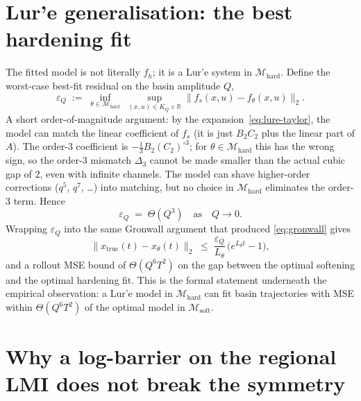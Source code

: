 \documentclass[11pt]{article}
\newcommand{\R}{\mathbb{R}}
\newcommand{\Mhard}{\mathcal{M}_{\mathrm{hard}}}
\newcommand{\Msoft}{\mathcal{M}_{\mathrm{soft}}}
\begin{document}
\section{Lur'e generalisation: the best hardening fit}

The fitted model is not literally \(f_h\); it is a Lur'e system in
\(\Mhard\). Define the worst-case best-fit residual on the basin
amplitude \(Q\),
\begin{equation}
\varepsilon_Q
\;:=\;
\inf_{\theta \in \Mhard}\;
\sup_{(x,u) \in K_Q \times \R}
\bigl\| f_s(x,u) - f_\theta(x,u) \bigr\|_2.
\label{eq:eps-Q}
\end{equation}
A short order-of-magnitude argument: by the
expansion~\eqref{eq:lure-taylor}, the model can match the
linear coefficient of \(f_s\) (it is just \(B_2 C_2\) plus the linear
part of \(A\)). The order-3 coefficient is
\(-\tfrac{1}{3} B_2 (C_2)^{\circ 3}\); for \(\theta \in \Mhard\) this
has the wrong sign, so the order-3 mismatch \(\Delta_3\) cannot be
made smaller than the actual cubic gap of \(2\), even with infinite
channels. The model can shave higher-order corrections (\(q^5\),
\(q^7\), \dots) into matching, but no choice in \(\Mhard\) eliminates
the order-3 term. Hence
\begin{equation}
\varepsilon_Q \;=\; \Theta(Q^{3})
\quad\text{as}\quad Q \to 0.
\label{eq:eps-Q-scaling}
\end{equation}
Wrapping \(\varepsilon_Q\) into the same Gronwall argument that
produced \eqref{eq:gronwall} gives
\begin{equation}
\bigl\| x_{\text{true}}(t) - x_\theta(t) \bigr\|_2
\;\le\;
\frac{\varepsilon_Q}{L_\theta}\, \bigl(e^{L_\theta t} - 1\bigr),
\label{eq:gronwall-lure}
\end{equation}
and a rollout MSE bound of \(\Theta(Q^{6} T^{2})\) on the gap between
the optimal softening and the optimal hardening fit. This is the
formal statement underneath the empirical observation: a Lur'e model
in \(\Mhard\) can fit basin trajectories with MSE within
\(\Theta(Q^{6} T^{2})\) of the optimal model in \(\Msoft\).

\section{Why a log-barrier on the regional LMI does not break the symmetry}
\end{document}
